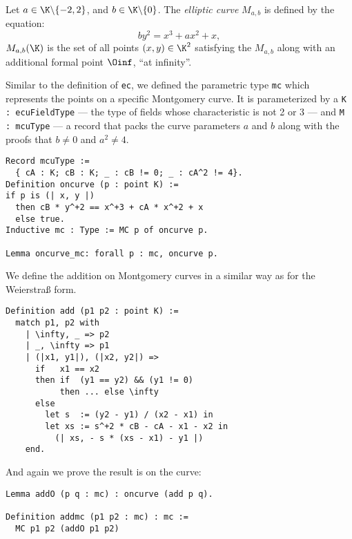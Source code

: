 \begin{dfn}
  Let $a \in \K \backslash \{-2, 2\}$, and $b \in \K \backslash \{ 0\}$.
  The \textit{elliptic curve} $M_{a,b}$ is defined by the equation:
  $$by^2 = x^3 + ax^2 + x,$$
  $M_{a,b}(\K)$ is the set of all points $(x,y) \in \K^2$ satisfying the $M_{a,b}$
  along with an additional formal point $\Oinf$, ``at infinity''.
\end{dfn}
Similar to the definition of \texttt{ec}, we defined the parametric type \texttt{mc} which
represents the points on a specific Montgomery curve.
It is parameterized by
a \texttt{K : ecuFieldType} --- the type of fields whose characteristic is not
2 or 3 --- and \texttt{M : mcuType} --- a record that packs the curve
parameters $a$ and $b$ along with the proofs that $b \neq 0$ and $a^2 \neq 4$.
\begin{lstlisting}[language=Coq,belowskip=-0.1 \baselineskip]
Record mcuType :=
  { cA : K; cB : K; _ : cB != 0; _ : cA^2 != 4}.
Definition oncurve (p : point K) :=
if p is (| x, y |)
  then cB * y^+2 == x^+3 + cA * x^+2 + x
  else true.
Inductive mc : Type := MC p of oncurve p.

Lemma oncurve_mc: forall p : mc, oncurve p.
\end{lstlisting}
We define the addition on Montgomery curves in a similar way as for the Weierstra{\ss} form.
\begin{lstlisting}[language=Coq,belowskip=-0.25 \baselineskip]
Definition add (p1 p2 : point K) :=
  match p1, p2 with
    | \infty, _ => p2
    | _, \infty => p1
    | (|x1, y1|), (|x2, y2|) =>
      if   x1 == x2
      then if  (y1 == y2) && (y1 != 0)
           then ... else \infty
      else
        let s  := (y2 - y1) / (x2 - x1) in
        let xs := s^+2 * cB - cA - x1 - x2 in
          (| xs, - s * (xs - x1) - y1 |)
    end.
\end{lstlisting}
And again we prove the result is on the curve: %
\begin{lstlisting}[language=Coq]
Lemma addO (p q : mc) : oncurve (add p q).

Definition addmc (p1 p2 : mc) : mc :=
  MC p1 p2 (addO p1 p2)
\end{lstlisting}

